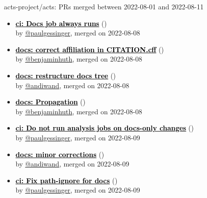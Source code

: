 \begin{frame}[allowframebreaks]{ acts-project/acts: PRs merged 
between 2022-08-01 and 2022-08-11
}
\begin{itemize}
    \item\prmerged\textbf{\href{https://github.com/acts-project/acts/pull/1391}{\textcolor{black}{ci: Docs job always runs}}}
    (\href{https://github.com/acts-project/acts/pull/1391}{}) \\
    by \href{https://github.com/paulgessinger}{@paulgessinger}, merged on 2022-08-08

    \item\prmerged\textbf{\href{https://github.com/acts-project/acts/pull/1390}{\textcolor{black}{docs: correct affiliation in CITATION.cff}}}
    (\href{https://github.com/acts-project/acts/pull/1390}{}) \\
    by \href{https://github.com/benjaminhuth}{@benjaminhuth}, merged on 2022-08-08

    \item\prmerged\prwip\textbf{\href{https://github.com/acts-project/acts/pull/1387}{\textcolor{black}{docs: restructure docs tree}}}
    (\href{https://github.com/acts-project/acts/pull/1387}{}) \\
    by \href{https://github.com/andiwand}{@andiwand}, merged on 2022-08-08

    \item\prmerged\textbf{\href{https://github.com/acts-project/acts/pull/1396}{\textcolor{black}{docs: Propagation}}}
    (\href{https://github.com/acts-project/acts/pull/1396}{}) \\
    by \href{https://github.com/benjaminhuth}{@benjaminhuth}, merged on 2022-08-08

    \item\prmerged\textbf{\href{https://github.com/acts-project/acts/pull/1400}{\textcolor{black}{ci: Do not run analysis jobs on docs-only changes}}}
    (\href{https://github.com/acts-project/acts/pull/1400}{}) \\
    by \href{https://github.com/paulgessinger}{@paulgessinger}, merged on 2022-08-09

    \item\prmerged\textbf{\href{https://github.com/acts-project/acts/pull/1405}{\textcolor{black}{docs: minor corrections}}}
    (\href{https://github.com/acts-project/acts/pull/1405}{}) \\
    by \href{https://github.com/andiwand}{@andiwand}, merged on 2022-08-09

    \item\prmerged\textbf{\href{https://github.com/acts-project/acts/pull/1408}{\textcolor{black}{ci: Fix path-ignore for docs}}}
    (\href{https://github.com/acts-project/acts/pull/1408}{}) \\
    by \href{https://github.com/paulgessinger}{@paulgessinger}, merged on 2022-08-09


\end{itemize}
\end{frame}
